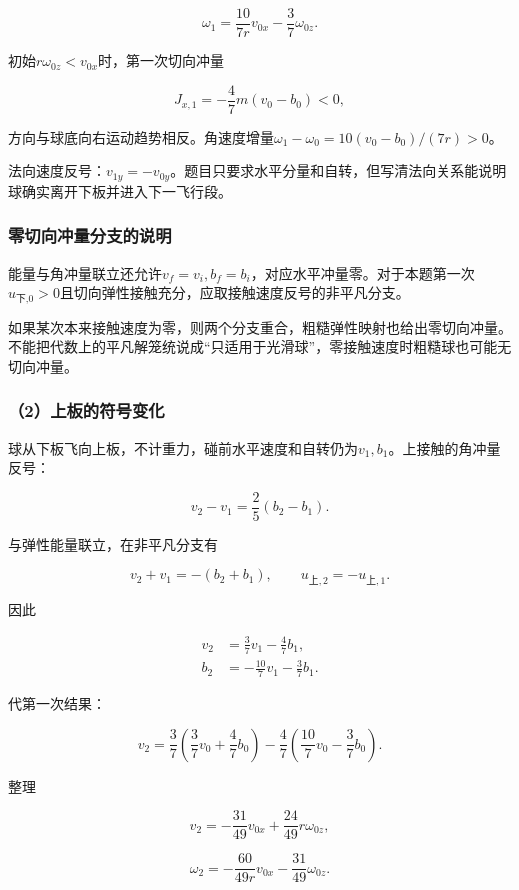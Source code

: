 \documentclass[12pt,a4paper,fontset=fandol]{ctexart}
\begin{document}
\[
\boxed{\omega_1=\frac{10}{7r}v_{0x}-\frac37\omega_{0z}}.
\]

初始\(r\omega_{0z}<v_{0x}\)时，第一次切向冲量

\[
J_{x,1}=-\frac47m(v_0-b_0)<0,
\]

方向与球底向右运动趋势相反。角速度增量\(\omega_1-\omega_0=10(v_0-b_0)/(7r)>0\)。

法向速度反号：\(v_{1y}=-v_{0y}\)。题目只要求水平分量和自转，但写清法向关系能说明球确实离开下板并进入下一飞行段。

\subsubsection{零切向冲量分支的说明}\label{ux96f6ux5207ux5411ux51b2ux91cfux5206ux652fux7684ux8bf4ux660e}

能量与角冲量联立还允许\(v_f=v_i,b_f=b_i\)，对应水平冲量零。对于本题第一次\(u_{\text{下,0}}>0\)且切向弹性接触充分，应取接触速度反号的非平凡分支。

如果某次本来接触速度为零，则两个分支重合，粗糙弹性映射也给出零切向冲量。不能把代数上的平凡解笼统说成``只适用于光滑球''，零接触速度时粗糙球也可能无切向冲量。

\subsubsection{（2）上板的符号变化}\label{ux4e0aux677fux7684ux7b26ux53f7ux53d8ux5316}

球从下板飞向上板，不计重力，碰前水平速度和自转仍为\(v_1,b_1\)。上接触的角冲量反号：

\[
v_2-v_1=\frac25(b_2-b_1).
\]

与弹性能量联立，在非平凡分支有

\[
v_2+v_1=-(b_2+b_1),
\qquad
u_{{\text{上}},2}=-u_{{\text{上}},1}.
\]

因此

\[
\begin{aligned}
v_2&=\frac37v_1-\frac47b_1,\\
b_2&=-\frac{10}{7}v_1-\frac37b_1.
\end{aligned}
\]

代第一次结果：

\[
v_2=\frac37\left(\frac37v_0+\frac47b_0\right)
-\frac47\left(\frac{10}{7}v_0-\frac37b_0\right).
\]

整理

\[
\boxed{v_2=-\frac{31}{49}v_{0x}
+\frac{24}{49}r\omega_{0z}},
\]

\[
\boxed{\omega_2=-\frac{60}{49r}v_{0x}
-\frac{31}{49}\omega_{0z}}.
\]
\end{document}
